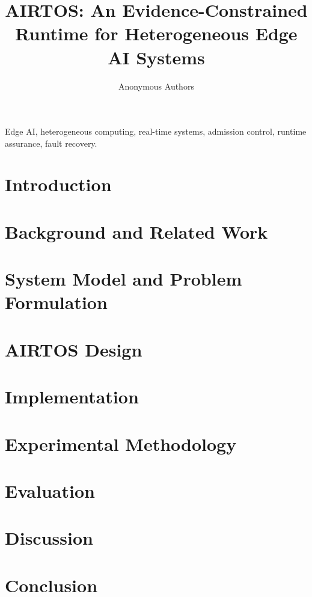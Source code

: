 \documentclass[lettersize,journal]{IEEEtran}
\begin{document}
\title{AIRTOS: An Evidence-Constrained Runtime for Heterogeneous Edge AI Systems}

\author{Anonymous Authors}

\maketitle

\begin{abstract}
\end{abstract}

\begin{IEEEkeywords}
Edge AI, heterogeneous computing, real-time systems, admission control, runtime assurance, fault recovery.
\end{IEEEkeywords}

\section{Introduction}

\section{Background and Related Work}

\section{System Model and Problem Formulation}

\section{AIRTOS Design}

\section{Implementation}

\section{Experimental Methodology}

\section{Evaluation}

\section{Discussion}

\section{Conclusion}

\clearpage


\end{document}
